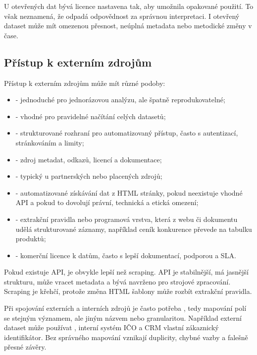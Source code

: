 U otevřených dat bývá licence nastavena tak, aby umožnila opakované použití. To však neznamená, že
odpadá odpovědnost za správnou interpretaci. I otevřený dataset může mít omezenou přesnost, neúplná
metadata nebo metodické změny v čase.

\subsection{Přístup k externím zdrojům}
Přístup k externím zdrojům může mít různé podoby:
\begin{itemize}
  \item {} - jednoduché pro jednorázovou analýzu, ale špatně reprodukovatelné;
  \item {} - vhodné pro pravidelné načítání celých datasetů;
  \item {} - strukturované rozhraní pro automatizovaný přístup, často s autentizací,
  stránkováním a limity;
  \item {} - zdroj metadat, odkazů, licencí a dokumentace;
  \item {} - typický u partnerských nebo placených zdrojů;
  \item {} - automatizované získávání dat z HTML stránky, pokud neexistuje vhodné
  API a pokud to dovolují právní, technická a etická omezení;
  \item {} - extrakční pravidla nebo programová vrstva, která z webu či dokumentu udělá
  strukturované záznamy, například ceník konkurence převede na tabulku produktů;
  \item {} - komerční licence k datům, často s lepší dokumentací, podporou a SLA.
\end{itemize}

Pokud existuje API, je obvykle lepší než scraping. API je stabilnější, má jasnější strukturu, může
vracet metadata a bývá navrženo pro strojové zpracování. Scraping je křehčí, protože změna HTML
šablony může rozbít extrakční pravidla.

Při spojování externích a interních zdrojů je často potřeba , tedy mapování
polí se stejným významem, ale jiným názvem nebo granularitou. Například externí dataset může používat
, interní systém IČO a CRM vlastní zákaznický identifikátor. Bez správného mapování
vznikají duplicity, chybné vazby a falešně přesné závěry.

